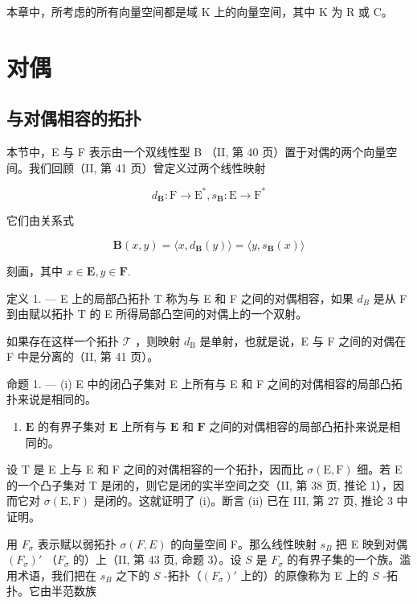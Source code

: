 本章中，所考虑的所有向量空间都是域 K 上的向量空间，其中 K 为 R 或 C。

\section{对偶}

\subsection{与对偶相容的拓扑}

本节中，E 与 F 表示由一个双线性型 B （II, 第 40 页）置于对偶的两个向量空间。我们回顾（II, 第 41 页）曾定义过两个线性映射

\[
d _ {\mathbf {B}}: \mathrm{F} \to \mathrm{E} ^ {*}, s _ {\mathbf {B}}: \mathrm{E} \to \mathrm{F} ^ {*}
\]

它们由关系式

\[
\mathbf {B} (x, y) = \langle x, d _ {\mathbf {B}} (y) \rangle = \langle y, s _ {\mathbf {B}} (x) \rangle\tag{1}
\]

刻画，其中 \(x\in \mathbf{E},y\in \mathbf{F}.\)

定义 1. --- E 上的局部凸拓扑 T 称为与 E 和 F 之间的对偶相容，如果 \(d_{B}\) 是从 F 到由赋以拓扑 T 的 E 所得局部凸空间的对偶上的一个双射。

如果存在这样一个拓扑 \(\mathcal{T}\) ，则映射 \(d_{\mathrm{B}}\) 是单射，也就是说，E 与 F 之间的对偶在 F 中是分离的（II, 第 41 页）。

命题 1. --- (i) E 中的闭凸子集对 E 上所有与 E 和 F 之间的对偶相容的局部凸拓扑来说是相同的。

\begin{enumerate}
\def\labelenumi{(\roman{enumi})}
\setcounter{enumi}{1}
\tightlist
\item
  \(\mathbf{E}\) 的有界子集对 \(\mathbf{E}\) 上所有与 \(\mathbf{E}\) 和 \(\mathbf{F}\) 之间的对偶相容的局部凸拓扑来说是相同的。
\end{enumerate}

设 T 是 E 上与 E 和 F 之间的对偶相容的一个拓扑，因而比 \(\sigma(\mathrm{E},\mathrm{F})\) 细。若 E 的一个凸子集对 T 是闭的，则它是闭的实半空间之交（II, 第 38 页, 推论 1），因而它对 \(\sigma(\mathrm{E},\mathrm{F})\) 是闭的。这就证明了 (i)。断言 (ii) 已在 III, 第 27 页, 推论 3 中证明。

用 \(F_{\sigma}\) 表示赋以弱拓扑 \(\sigma(F, E)\) 的向量空间 F。那么线性映射 \(s_{B}\) 把 E 映到对偶 \((F_{\sigma})'\) （\(F_{\sigma}\) 的）上（II, 第 43 页, 命题 3）。设 \(S\) 是 \(F_{\sigma}\) 的有界子集的一个族。滥用术语，我们把在 \(s_{B}\) 之下的 \(S\) -拓扑（\((F_{\sigma})'\) 上的）的原像称为 E 上的 \(S\) -拓扑。它由半范数族

